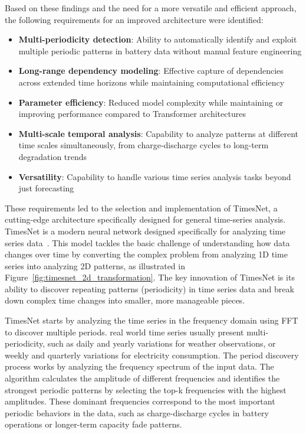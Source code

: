 Based on these findings and the need for a more versatile and efficient approach, the following requirements for an improved architecture were identified:

\begin{itemize}
    \item \textbf{Multi-periodicity detection}: Ability to automatically identify and exploit multiple periodic patterns in battery data without manual feature engineering
    \item \textbf{Long-range dependency modeling}: Effective capture of dependencies across extended time horizons while maintaining computational efficiency
    \item \textbf{Parameter efficiency}: Reduced model complexity while maintaining or improving performance compared to Transformer architectures
    \item \textbf{Multi-scale temporal analysis}: Capability to analyze patterns at different time scales simultaneously, from charge-discharge cycles to long-term degradation trends
    \item \textbf{Versatility}: Capability to handle various time series analysis tasks beyond just forecasting
\end{itemize}

These requirements led to the selection and implementation of TimesNet, a cutting-edge architecture specifically designed for general time-series analysis. TimesNet is a modern neural network designed specifically for analyzing time series data~\cite{wu_timesnet_2023}. This model tackles the basic challenge of understanding how data changes over time by converting the complex problem from analyzing 1D time series into analyzing 2D patterns, as illustrated in Figure~\ref{fig:timesnet_2d_transformation}. The key innovation of TimesNet is its ability to discover repeating patterns (periodicity) in time series data and break down complex time changes into smaller, more manageable pieces.


TimesNet starts by analyzing the time series in the frequency domain using FFT to discover multiple periods. real world time series usually present multi-periodicity, such as daily and yearly variations for weather observations, or weekly and quarterly variations for electricity consumption. The period discovery process works by analyzing the frequency spectrum of the input data. The algorithm calculates the amplitude of different frequencies and identifies the strongest periodic patterns by selecting the top-k frequencies with the highest amplitudes. These dominant frequencies correspond to the most important periodic behaviors in the data, such as charge-discharge cycles in battery operations or longer-term capacity fade patterns.


